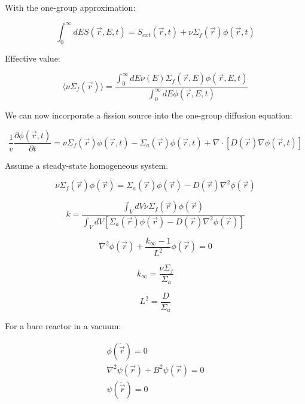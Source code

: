 \documentclass[12pt]{article}
\newcommand{\rvec}{\ensuremath{\vec{r}}}
\begin{document}
With the one-group approximation:

\begin{equation*}
\int_{0}^{\infty}dE S(\rvec,E,t) = S_{ext}(\rvec,t) + 
\nu\Sigma_f(\rvec)\phi(\rvec,t)
\end{equation*}

Effective value:

\begin{equation*}
\langle\nu\Sigma_f(\rvec)\rangle = 
\frac{\int_{0}^{\infty}dE\nu(E)\Sigma_f(\rvec,E)\phi(\rvec,E,t)}{\int_{0}^{\infty}dE\phi(\rvec,E,t)}
\end{equation*}

We can now incorporate a fission source into the one-group diffusion equation:

\begin{equation*}
\frac{1}{v}\frac{\partial\phi(\rvec,t)}{\partial t} = \nu\Sigma_f(\rvec)\phi(\rvec,t) - 
\Sigma_a(\rvec)\phi(\rvec,t) + \nabla\cdot[D(\rvec)\nabla\phi(\rvec,t)]
\end{equation*}

Assume a steady-state homogeneous system.

\begin{equation*}
\nu\Sigma_f(\rvec)\phi(\rvec) = 
\Sigma_a(\rvec)\phi(\rvec) - D(\rvec)\nabla^2\phi(\rvec)
\end{equation*}

\begin{equation*}
k = \frac{\int_V dV\nu\Sigma_f(\rvec)\phi(\rvec)}{\int_V dV[\Sigma_a(\rvec)\phi(\rvec) - D(\rvec)\nabla^2\phi(\rvec)]}
\end{equation*}

\begin{equation*}
\nabla^2\phi(\rvec) + \frac{k_{\infty} - 1}{L^2}\phi(\rvec) = 0
\end{equation*}

\begin{equation*}
k_{\infty} = \frac{\nu\Sigma_f}{\Sigma_a}
\end{equation*}

\begin{equation*}
L^2 = \frac{D}{\Sigma_a}
\end{equation*}

For a bare reactor in a vacuum:

\begin{gather*}
\phi(\tilde{\rvec}) = 0 \\
\nabla^2\psi(\rvec) + B^2\psi(\rvec) = 0 \\
\psi(\tilde{\rvec}) = 0
\end{gather*}
\end{document}
